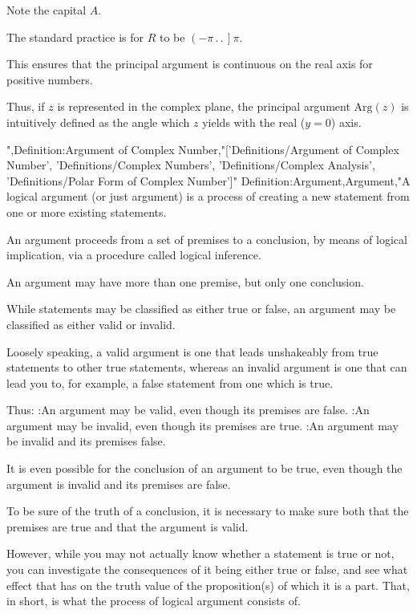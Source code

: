 Note the capital $A$.

The standard practice is for $R$ to be $\left( -\pi \,.\,.\,   \right]\pi$.

This ensures that the principal argument is continuous on the real axis for positive numbers.

Thus, if $z$ is represented in the complex plane, the principal argument $\mathrm {Arg} \left( z \right)$ is intuitively defined as the angle which $z$ yields with the real ($y = 0$) axis.



",Definition:Argument of Complex Number,"['Definitions/Argument of Complex Number', 'Definitions/Complex Numbers', 'Definitions/Complex Analysis', 'Definitions/Polar Form of Complex Number']"
Definition:Argument,Argument,"A logical argument (or just argument) is a process of creating a new statement from one or more existing statements.

An argument proceeds from a set of premises to a conclusion, by means of logical implication, via a procedure called logical inference.


An argument may have more than one premise, but only one conclusion.


While statements may be classified as either true or false, an argument may be classified as either valid or invalid.


Loosely speaking, a valid argument is one that leads unshakeably from true statements to other true statements, whereas an invalid argument is one that can lead you to, for example, a false statement from one which is true.


Thus:
:An argument may be valid, even though its premises are false.
:An argument may be invalid, even though its premises are true.
:An argument may be invalid and its premises false.

It is even possible for the conclusion of an argument to be true, even though the argument is invalid and its premises are false.


To be sure of the truth of a conclusion, it is necessary to make sure both that the premises are true and that the argument is valid.


However, while you may not actually know whether a statement is true or not, you can investigate the consequences of it being either true or false, and see what effect that has on the truth value of the proposition(s) of which it is a part. That, in short, is what the process of logical argument consists of.


